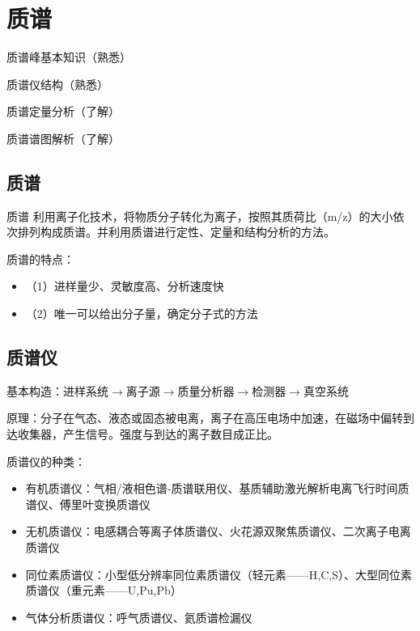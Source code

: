 \chapter{质谱}
\begin{introduction}
    \item 质谱峰基本知识（熟悉）
    \item 质谱仪结构（熟悉）
    \item 质谱定量分析（了解）
    \item 质谱谱图解析（了解）
\end{introduction}
\section{质谱}
\begin{definition*}{质谱}
    利用离子化技术，将物质分子转化为离子，按照其质荷比（m/z）的大小依次排列构成质谱。并利用质谱进行定性、定量和结构分析的方法。
\end{definition*}
质谱的特点：
\begin{itemize}
    \item （1）进样量少、灵敏度高、分析速度快
    \item （2）唯一可以给出分子量，确定分子式的方法
\end{itemize}


\section{质谱仪}

基本构造：进样系统$\rightarrow$离子源$\rightarrow$质量分析器$\rightarrow$检测器$\rightarrow$真空系统

原理：分子在气态、液态或固态被电离，离子在高压电场中加速，在磁场中偏转到达收集器，产生信号。强度与到达的离子数目成正比。

质谱仪的种类：
\begin{itemize}
    \item 有机质谱仪：气相/液相色谱-质谱联用仪、基质辅助激光解析电离飞行时间质谱仪、傅里叶变换质谱仪
    \item 无机质谱仪：电感耦合等离子体质谱仪、火花源双聚焦质谱仪、二次离子电离质谱仪
    \item 同位素质谱仪：小型低分辨率同位素质谱仪（轻元素——H,C,S）、大型同位素质谱仪（重元素——U,Pu,Pb）
    \item 气体分析质谱仪：呼气质谱仪、氦质谱检漏仪
\end{itemize}
